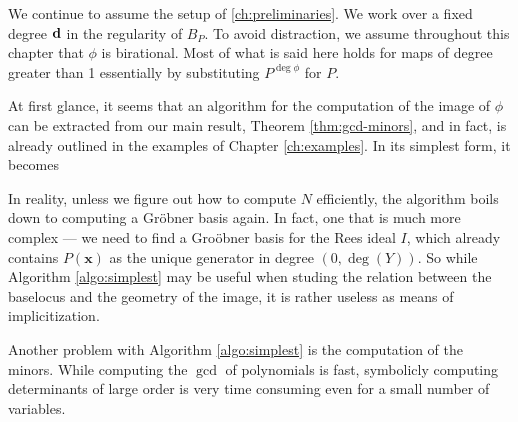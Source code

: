 \documentclass[fleqn,reqno]{amsart}
\newcounter{chapter}
\numberwithin{first}{chapter}
\begin{document}
\begin{paragraf}
We continue to assume the setup of \ref{ch:preliminaries}.
We work over a fixed degree $\mathbf d$ in the regularity of $B_P$.
To avoid distraction, we assume throughout this chapter that $\phi$ is birational.
Most of what is said here holds for maps of degree greater than 1 essentially by
substituting $P^{\deg\phi}$ for $P$.
\end{paragraf}

\begin{paragraf}
At first glance, it seems that an algorithm for the computation of the image of $\phi$ can be
extracted from our main result, Theorem \ref{thm:gcd-minors}, and in fact,
is already outlined in the examples of Chapter \ref{ch:examples}.
In its simplest form, it becomes
\end{paragraf}


\begin{paragraf}
\label{par:problem-computing-rees-gb}
In reality, unless we figure out how to compute $N$ efficiently,
the algorithm boils down to computing a Gr\"obner basis again.
In fact, one that is much more complex ---
we need to find a Gro\"{o}bner basis for the Rees ideal $I$,
which already contains $P(\mathbf x)$ as the unique generator in degree $(0,\deg(Y))$.
So while Algorithm \ref{algo:simplest} may be useful when studing
the relation between the baselocus and the geometry of the image,
it is rather useless as means of implicitization.
\end{paragraf}

\begin{paragraf}
\label{par:problem-too-many-minors}
Another problem with Algorithm \ref{algo:simplest} is the computation of the minors.
While computing the $\gcd$ of polynomials is fast,
symbolicly computing determinants of large order is very time consuming even for a small number of variables.
\end{paragraf}
\end{document}

